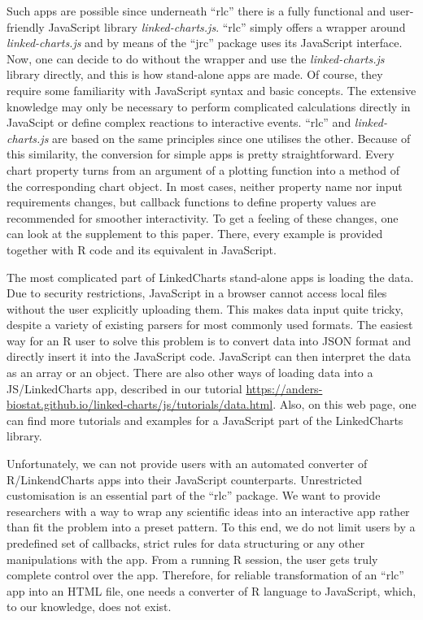 \documentclass[twocolumn,10pt]{article}
\begin{document}
Such apps are possible since underneath ``rlc'' there is a fully functional and user-friendly JavaScript library \emph{linked-charts.js}. ``rlc'' simply offers a wrapper around \emph{linked-charts.js} and by means of the ``jrc'' package uses its JavaScript interface. Now, one can decide to do without the wrapper and use the \emph{linked-charts.js} library directly, and this is how stand-alone apps are made. Of course, they require some familiarity with JavaScript syntax and basic concepts. The extensive knowledge may only be necessary to perform complicated calculations directly in JavaScipt or define complex reactions to interactive events. ``rlc'' and \emph{linked-charts.js} are based on the same principles since one utilises the other. Because of this similarity, the conversion for simple apps is pretty straightforward. Every chart property turns from an argument of a plotting function into a method of the corresponding chart object. In most cases, neither property name nor input requirements changes, but callback functions to define property values are recommended for smoother interactivity. To get a feeling of these changes, one can look at the supplement to this paper. There, every example is provided together with R code and its equivalent in JavaScript.

The most complicated part of LinkedCharts stand-alone apps is loading the data. Due to security restrictions, JavaScript in a browser cannot access local files without the user explicitly uploading them. This makes data input quite tricky, despite a variety of existing parsers for most commonly used formats. The easiest way for an R user to solve this problem is to convert data into JSON format and directly insert it into the JavaScript code. JavaScript can then interpret the data as an array or an object. There are also other ways of loading data into a JS/LinkedCharts app, described in our tutorial \url{https://anders-biostat.github.io/linked-charts/js/tutorials/data.html}. Also, on this web page, one can find more tutorials and examples for a JavaScript part of the LinkedCharts library.

Unfortunately, we can not provide users with an automated converter of R/LinkendCharts apps into their JavaScript counterparts. Unrestricted customisation is an essential part of the ``rlc'' package. We want to provide researchers with a way to wrap any scientific ideas into an interactive app rather than fit the problem into a preset pattern. To this end, we do not limit users by a predefined set of callbacks, strict rules for data structuring or any other manipulations with the app. From a running R session, the user gets truly complete control over the app. Therefore, for reliable transformation of an ``rlc'' app into an HTML file, one needs a converter of R language to JavaScript, which, to our knowledge, does not exist.
\end{document}
